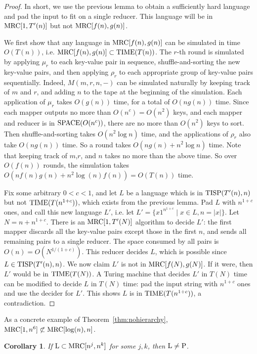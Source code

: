 \documentclass[11pt]{article}
\newtheorem{cor}[thm]{Corollary}
\theoremstyle{definition}
\theoremstyle{remark}
\newcommand{\mrc}{\textup{MRC}}
\newcommand{\SPACE}{\textup{SPACE}}
\newcommand{\TIME}{\textup{TIME}}
\newcommand{\TISP}{\textup{TISP}}
\renewcommand{\P}{\textup{P}}
\renewcommand{\L}{\textup{L}}
\begin{document}
\begin{proof}

In short, we use the previous lemma to obtain a sufficiently hard language and
pad the input to fit on a single reducer. This language will be in $\mrc[1,
T'(n)]$ but not $\mrc[f(n), g(n)]$.

We first show that any language in $\mrc[f(n),g(n)]$ can be simulated in time
$O(T(n))$, i.e. $\mrc[f(n),g(n)] \subset \TIME(T(n))$. The $r$-th round is
simulated by applying $\mu_r$ to each key-value pair in sequence,
shuffle-and-sorting the new key-value pairs, and then applying $\rho_r$ to each
appropriate group of key-value pairs sequentially. Indeed, $M(m,r,n,-)$ can be
simulated naturally by keeping track of $m$ and $r$, and adding $n$ to the tape
at the beginning of the simulation. Each application of $\mu_r$ takes $O(g(n))$
time, for a total of $O(n g(n))$ time.  Since each mapper outputs no more than
$O(n^c) = O(n^2)$ keys, and each mapper and reducer is in $\SPACE(O(n^c))$,
there are no more than $O(n^2)$ keys to sort.  Then shuffle-and-sorting takes
$O(n^2 \log n)$ time, and the applications of $\rho_r$ also take $O(n g(n))$
time.  So a round takes $O(n g(n) + n^2 \log n)$ time. Note that keeping track
of $m$,$r$, and $n$ takes no more than the above time. So over $O(f(n))$
rounds, the simulation takes $O(nf(n)g(n)+n^2 \log(n) f(n))=O(T(n))$ time.

Fix some arbitrary $0 < c < 1$, and let $L$ be a language which is in
$\TISP(T'(n), n)$ but not $\TIME(T(n^{1+c}))$, which exists from the previous
lemma. Pad $L$ with $n^{1+c}$ ones, and call this new language $L'$, i.e. let
$L' = \{x 1^{n^{1+c}} \mid x \in  L, n=|x|\}$.  Let $N = n + n^{1+c}$.  There
is an $\mrc[1, T'(N)]$ algorithm to decide $L'$: the first mapper discards all
the key-value pairs except those in the first $n$, and sends all remaining
pairs to a single reducer. The space consumed by all pairs is $O(n) =
O(N^{1/(1+c)})$.  This reducer decides $L$, which is possible since $L \in
\TISP(T'(n), n)$. We now claim $L'$ is not in $\mrc[f(N), g(N)]$. If it were,
then $L'$ would be in $\TIME(T(N))$. A Turing machine that decides $L'$ in
$T(N)$ time can be modified to decide $L$ in $T(N)$ time: pad the input string
with $n^{1+c}$ ones and use the decider for $L'$. This shows $L$ is in
$\TIME(T(n^{1+c}))$, a contradiction.
\end{proof}
As a concrete example of Theorem~\ref{thm:nohierarchy}, $\mrc[1, n^6] \not
\subset \mrc[\log(n), n]$. 

\begin{cor}\label{cor:lvsp}
If $\L \subset \mrc[n^j, n^k]$ for some $j, k$, then $\L \neq \P$.
\end{cor}
\end{document}
